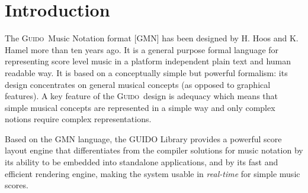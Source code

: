 \documentclass[twoside,10pt,a4paper]{article}
\affiliation{}{}
\title{\papertitle}
\newcommand{\Guido}	{\textsc{Guido}}
\begin{document}
    
\maketitle

\begin{abstract}
Based on the Guido Music Notation format, we have developed tools for music score composition, i.e. operators taking score both as target and as arguments of high level transformations applicable for example to the time domain (e.g. cutting the head or the tail of a score) or to the structural domains (e.g. putting scores in sequence or in parallel). 
Providing these operations at the score level is particularly convenient to express music ideas and to compose these ideas in an homogeneous representation space. However, scores composition gives raise to a set of issues related to the music notation consistency. The paper introduces the Guido Music Notation format, presents the score composition operations, the notation issues and a proposal to solve them.
\end{abstract}


\section{Introduction}\label{sec:intro}
The \Guido\ Music Notation format [GMN] \cite{hoos98} \cite{guido} has been designed by H. Hoos and K. Hamel more than ten years ago. It is a general purpose formal language for representing score level music in a platform independent plain text and human readable way. It is based on a conceptually simple but powerful formalism: its design concentrates on general musical concepts (as opposed to graphical features). A key feature of the \Guido\ design is adequacy which means that simple musical concepts are represented in a simple way and only complex notions require complex representations.

Based on the GMN language, the GUIDO Library \cite{daudin09a,Fober:04b} provides a powerful score layout engine that differentiates from the compiler solutions for music notation \cite{lilypond03,musixtex} by its ability to be embedded into standalone applications, and by its fast and efficient rendering engine, making the system usable in \emph{real-time} for simple music scores.
\end{document}
